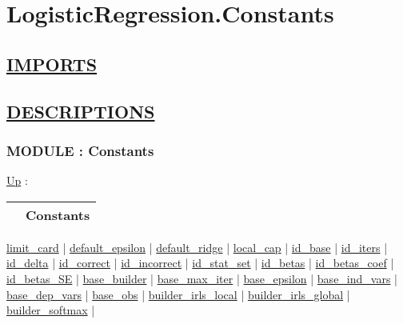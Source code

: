 \chapter*{LogisticRegression.Constants}
\hypertarget{ecldoc:toc:LogisticRegression.Constants}{}

\section*{\underline{IMPORTS}}

\section*{\underline{DESCRIPTIONS}}
\subsection*{MODULE : Constants}
\hypertarget{ecldoc:LogisticRegression.Constants}{}
\hyperlink{ecldoc:toc:LogisticRegression}{Up} :

{\renewcommand{\arraystretch}{1.5}
\begin{tabularx}{\textwidth}{|>{\raggedright\arraybackslash}l|X|}
\hline
\hspace{0pt} & Constants \\
\hline
\end{tabularx}
}

\par


\hyperlink{ecldoc:logisticregression.constants.limit_card}{limit\_card}  |
\hyperlink{ecldoc:logisticregression.constants.default_epsilon}{default\_epsilon}  |
\hyperlink{ecldoc:logisticregression.constants.default_ridge}{default\_ridge}  |
\hyperlink{ecldoc:logisticregression.constants.local_cap}{local\_cap}  |
\hyperlink{ecldoc:logisticregression.constants.id_base}{id\_base}  |
\hyperlink{ecldoc:logisticregression.constants.id_iters}{id\_iters}  |
\hyperlink{ecldoc:logisticregression.constants.id_delta}{id\_delta}  |
\hyperlink{ecldoc:logisticregression.constants.id_correct}{id\_correct}  |
\hyperlink{ecldoc:logisticregression.constants.id_incorrect}{id\_incorrect}  |
\hyperlink{ecldoc:logisticregression.constants.id_stat_set}{id\_stat\_set}  |
\hyperlink{ecldoc:logisticregression.constants.id_betas}{id\_betas}  |
\hyperlink{ecldoc:logisticregression.constants.id_betas_coef}{id\_betas\_coef}  |
\hyperlink{ecldoc:logisticregression.constants.id_betas_se}{id\_betas\_SE}  |
\hyperlink{ecldoc:logisticregression.constants.base_builder}{base\_builder}  |
\hyperlink{ecldoc:logisticregression.constants.base_max_iter}{base\_max\_iter}  |
\hyperlink{ecldoc:logisticregression.constants.base_epsilon}{base\_epsilon}  |
\hyperlink{ecldoc:logisticregression.constants.base_ind_vars}{base\_ind\_vars}  |
\hyperlink{ecldoc:logisticregression.constants.base_dep_vars}{base\_dep\_vars}  |
\hyperlink{ecldoc:logisticregression.constants.base_obs}{base\_obs}  |
\hyperlink{ecldoc:logisticregression.constants.builder_irls_local}{builder\_irls\_local}  |
\hyperlink{ecldoc:logisticregression.constants.builder_irls_global}{builder\_irls\_global}  |
\hyperlink{ecldoc:logisticregression.constants.builder_softmax}{builder\_softmax}  |

